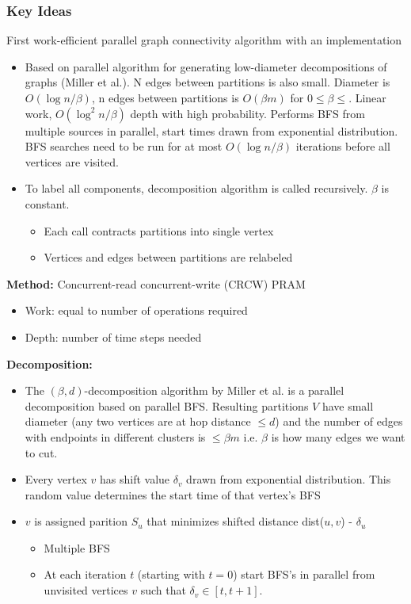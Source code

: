 \subsubsection{Key Ideas}

First work-efficient parallel graph connectivity algorithm with an implementation

\begin{itemize}
    \item Based on parallel algorithm for generating low-diameter decompositions of graphs (Miller et al.). N edges between partitions is also small. Diameter is $O(\log n/\beta)$, n edges between partitions is $O(\beta m)$ for $0 \le \beta \le$. Linear work, $O(\log^2 n/ \beta)$ depth with high probability. Performs BFS from multiple sources in parallel, start times drawn from exponential distribution. BFS searches need to be run for at most $O(\log n/ \beta)$ iterations before all vertices are visited.
    \item To label all components, decomposition algorithm is called recursively. $\beta$ is constant. 
    \begin{itemize}
        \item Each call contracts partitions into single vertex
        \item Vertices and edges between partitions are relabeled
    \end{itemize}
\end{itemize}

\textbf{Method: } Concurrent-read concurrent-write (CRCW) PRAM
\begin{itemize}
    \item Work: equal to number of operations required
    \item Depth: number of time steps needed
\end{itemize}

\textbf{Decomposition: }
\begin{itemize}
    \item The $(\beta, d)$-decomposition algorithm by Miller et al. is a parallel decomposition based on parallel BFS. Resulting partitions $V$ have small diameter (any two vertices are at hop distance $\leq d$) and the number of edges with endpoints in different clusters is $\leq \beta m$ i.e. $\beta$ is how many edges we want to cut. 
    \item Every vertex $v$ has shift value $\delta_v$ drawn from exponential distribution. This random value determines the start time of that vertex's BFS
    \item $v$ is assigned parition $S_u$ that minimizes shifted distance dist($u,v$) - $\delta_u$
    \begin{itemize}
        \item Multiple BFS
        \item At each iteration $t$ (starting with $t=0$) start BFS's in parallel from unvisited vertices $v$ such that $\delta_v \in [t, t+1]$.
    \end{itemize}
\end{itemize}

